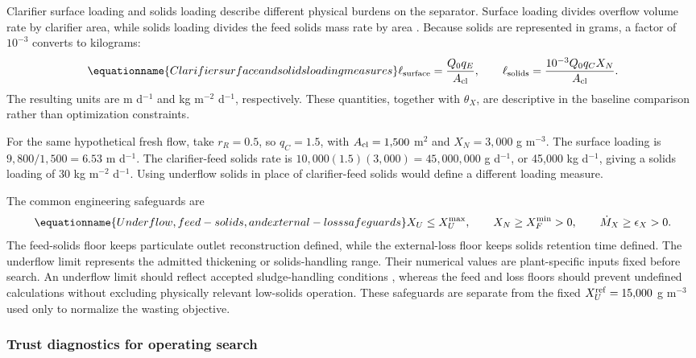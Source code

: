 Clarifier surface loading and solids loading describe different physical burdens on the separator. Surface loading divides overflow volume rate by clarifier area, while solids loading divides the feed solids mass rate by area \citep{Henze2008}. Because solids are represented in grams, a factor of $10^{-3}$ converts to kilograms:
\begin{equation}
\equationname{Clarifier surface and solids loading measures}
\ell_{\rm surface}=\frac{Q_0q_E}{A_{\rm cl}},\qquad
\ell_{\rm solids}=\frac{10^{-3}Q_0q_CX_N}{A_{\rm cl}}.
\label{eq:plant_loading_measures}
\end{equation}
The resulting units are m d$^{-1}$ and kg m$^{-2}$ d$^{-1}$, respectively. These quantities, together with $\theta_X$, are descriptive in the baseline comparison rather than optimization constraints.

For the same hypothetical fresh flow, take $r_R=0.5$, so $q_C=1.5$, with $A_{\rm cl}=1{,}500$ m$^2$ and $X_N=3{,}000$ g m$^{-3}$. The surface loading is $9{,}800/1{,}500=6.53$ m d$^{-1}$. The clarifier-feed solids rate is $10{,}000(1.5)(3{,}000)=45{,}000{,}000$ g d$^{-1}$, or 45{,}000 kg d$^{-1}$, giving a solids loading of 30 kg m$^{-2}$ d$^{-1}$. Using underflow solids in place of clarifier-feed solids would define a different loading measure.

The common engineering safeguards are
\begin{equation}
\equationname{Underflow, feed-solids, and external-loss safeguards}
X_U\le X_U^{\max},\qquad X_N\ge X_F^{\min}>0,\qquad
\dot M_X\ge\epsilon_X>0.
\label{eq:plant_engineering_safeguards}
\end{equation}
The feed-solids floor keeps particulate outlet reconstruction defined, while the external-loss floor keeps solids retention time defined. The underflow limit represents the admitted thickening or solids-handling range. Their numerical values are plant-specific inputs fixed before search. An underflow limit should reflect accepted sludge-handling conditions \citep{Henze2008}, whereas the feed and loss floors should prevent undefined calculations without excluding physically relevant low-solids operation. These safeguards are separate from the fixed $X_U^{\rm ref}=15{,}000$ g m$^{-3}$ used only to normalize the wasting objective.

\subsubsection{Trust diagnostics for operating search}

